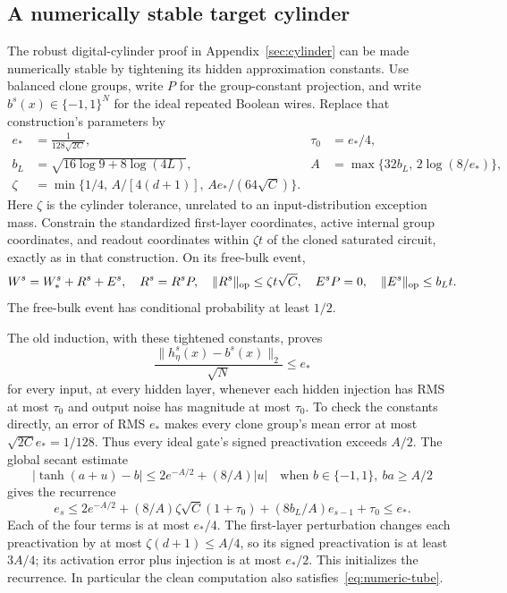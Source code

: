 \subsection{A numerically stable target cylinder}

The robust digital-cylinder proof in Appendix~\ref{sec:cylinder} can be made
numerically stable by tightening its hidden approximation constants. Use
balanced clone groups, write $P$ for the group-constant projection, and
write $b^s(x)\in\{-1,1\}^N$ for the ideal repeated Boolean wires. Replace
that construction's parameters by
\begin{align*}
 e_*&=\frac1{128\sqrt{2C}},&
 \tau_0&=e_*/4,\\
 b_L&=\sqrt{16\log9+8\log(4L)},&
 A&=\max\{32b_L,\,2\log(8/e_*)\},\\
 \zeta&=\min\{1/4,\,A/[4(d+1)],\,Ae_*/(64\sqrt C)\}.
\end{align*}
Here $\zeta$ is the cylinder tolerance, unrelated to an input-distribution
exception mass. Constrain the standardized first-layer coordinates, active
internal group coordinates, and readout coordinates within $\zeta t$ of
the cloned saturated circuit, exactly as in that construction. On its
free-bulk event,
\[
 W^s=W_*^s+R^s+E^s,\quad
 R^s=R^sP,\quad \|R^s\|_{\rm op}\le\zeta t\sqrt C,\quad
 E^sP=0,\quad \|E^s\|_{\rm op}\le b_Lt.
\]
The free-bulk event has conditional probability at least $1/2$.

The old induction, with these tightened constants, proves
\begin{equation}\label{eq:numeric-tube}
 \frac{\|h^s_\eta(x)-b^s(x)\|_2}{\sqrt N}\le e_*
\end{equation}
for every input, at every hidden layer, whenever each hidden injection has
RMS at most $\tau_0$ and output noise has magnitude at most $\tau_0$.
To check the constants directly, an error of RMS $e_*$ makes every clone
group's mean error at most $\sqrt{2C}e_*=1/128$. Thus every ideal gate's
signed preactivation exceeds $A/2$. The global secant estimate
\[
 |\tanh(a+u)-b|\le2e^{-A/2}+(8/A)|u|
 \quad\text{when }b\in\{-1,1\},\ ba\ge A/2
\]
gives the recurrence
\[
 e_s\le2e^{-A/2}+(8/A)\zeta\sqrt C(1+\tau_0)
               +(8b_L/A)e_{s-1}+\tau_0\le e_*.
\]
Each of the four terms is at most $e_*/4$.
The first-layer perturbation changes each preactivation by at most
$\zeta(d+1)\le A/4$, so its signed preactivation is at least $3A/4$;
its activation error plus injection is at most $e_*/2$.
This initializes the recurrence. In particular the clean computation
also satisfies~\eqref{eq:numeric-tube}.

